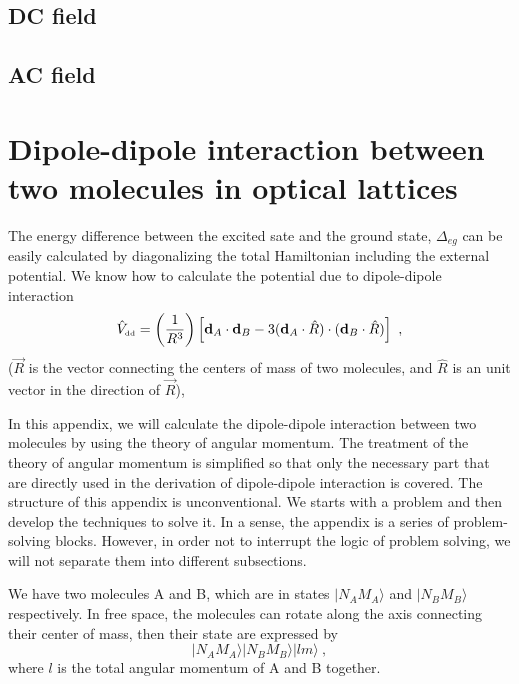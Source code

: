 \subsection{DC field}
\label{sec:dcField}

\subsection{AC field}
\label{sec:acField}



\section{Dipole-dipole interaction between two molecules in optical lattices}
\label{sec::ddInteraction}

The energy difference between the excited sate and the ground state, $\Delta_{eg}$ can be easily calculated by diagonalizing  the total Hamiltonian including the external potential. We know how to calculate the potential due to dipole-dipole interaction 
\begin{equation}
\hat{V}_{\mbox{\tiny dd}} = \left(\frac{1}{R^3}\right)\left[ \mathbf{d}_{A}\cdot\mathbf{d}_{B}-3(\mathbf{d}_{A}\cdot\hat{R})\cdot(\mathbf{d}_{B}\cdot\hat{R})\right] \ , \nonumber
\end{equation}
($\vec{R}$ is the vector connecting the centers of mass of two molecules, and $\hat{R}$ is an unit vector in the direction of $\vec{R}$), 


In this appendix, we will calculate the dipole-dipole interaction between two molecules by using the theory of angular momentum. The treatment of the theory of angular momentum is simplified so that only the necessary part that are directly used in the derivation of dipole-dipole interaction is covered. The structure of this appendix is  unconventional. We starts with a problem and then develop the techniques to solve it. In a sense, the appendix is a series of problem-solving blocks. However, in order not to interrupt the logic of problem solving, we will not separate them into different subsections. 

We have two molecules A and B, which are in states $|N_{A}M_{A}\rangle$ and $|N_{B}M_{B}\rangle$ respectively. In free space, the molecules can rotate along the axis connecting their center of mass, then their state are expressed by
\begin{equation}
|N_{A}M_{A}\rangle |N_{B}M_{B}\rangle |lm\rangle  \ , \nonumber
\end{equation}
where $l$ is the total angular momentum of A and B together. 

